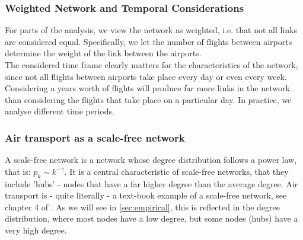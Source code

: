 \subsubsection{Weighted Network and Temporal Considerations}
For parts of the analysis, we view the network as weighted, i.e. that not all links are considered equal. Specifically, we let the number of flights between airports determine the weight of the link between the airports.
\medskip \\
The considered time frame clearly matters for the characteristics of the network, since not all flights between airports take place every day or even every week. Considering a years worth of flights will produce far more links in the network than considering the flights that take place on a particular day. In practice, we analyse different time periods.

\subsubsection{Air transport as a scale-free network}
A scale-free network is a network whose degree distribution follows a power law, that is: $p_k \sim k^{-\gamma}$. It is a central characteristic of scale-free networks, that they include 'hubs' - nodes that have a far higher degree than the average degree. Air transport is - quite literally - a text-book example of a scale-free network, see chapter 4 of \cite{Barabasi}. As we will see in \ref{sec:empirical}, this is reflected in the degree distribution, where most nodes have a low degree, but some nodes (hubs) have a very high degree.  


